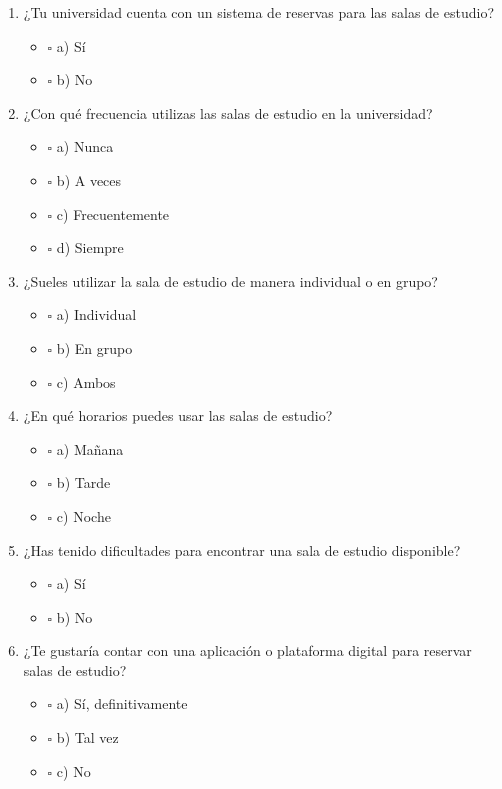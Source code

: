 \documentclass{article}
\begin{document}
\begin{multicols}{2}
  \begin{enumerate}
    \item ¿Tu universidad cuenta con un sistema de reservas para las salas de estudio? 
    \begin{itemize}
      \item $\square$ a) Sí
      \item $\square$ b) No
    \end{itemize}
  
    \item ¿Con qué frecuencia utilizas las salas de estudio en la universidad? 
    \begin{itemize}
      \item $\square$ a) Nunca
      \item $\square$ b) A veces
      \item $\square$ c) Frecuentemente
      \item $\square$ d) Siempre
    \end{itemize}
  
    \item ¿Sueles utilizar la sala de estudio de manera individual o en grupo? 
    \begin{itemize}
      \item $\square$ a) Individual
      \item $\square$ b) En grupo
      \item $\square$ c) Ambos
    \end{itemize}
  
    \item ¿En qué horarios puedes usar las salas de estudio? 
    \begin{itemize}
      \item $\square$ a) Mañana
      \item $\square$ b) Tarde
      \item $\square$ c) Noche
    \end{itemize}
  
    \item ¿Has tenido dificultades para encontrar una sala de estudio disponible? 
    \begin{itemize}
      \item $\square$ a) Sí
      \item $\square$ b) No
    \end{itemize}
  
    \item ¿Te gustaría contar con una aplicación o plataforma digital para reservar salas de estudio? 
    \begin{itemize}
      \item $\square$ a) Sí, definitivamente
      \item $\square$ b) Tal vez
      \item $\square$ c) No
    \end{itemize}
  \end{enumerate}  
\end{multicols}
\end{document}
